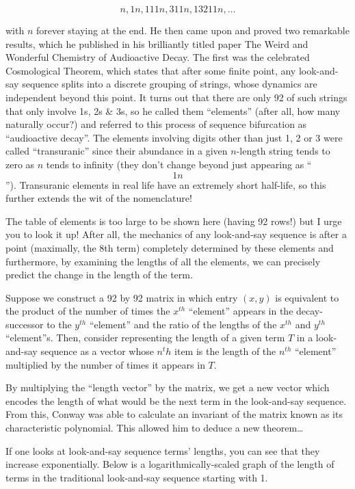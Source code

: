 \documentclass[titlepage,a4paper]{article}
\begin{document}
\[n, 1n, 111n, 311n, 13211n, \ldots\]

with \(n\) forever staying at the end. He then came upon and proved two remarkable results, which he published in his brilliantly titled paper The Weird and Wonderful Chemistry of Audioactive Decay. The first was the celebrated Cosmological Theorem, which states that after some finite point, any look-and-say sequence splits into a discrete grouping of strings, whose dynamics are independent beyond this point. It turns out that there are only 92 of such strings that only involve 1s, 2s \& 3s, so he called them “elements” (after all, how many naturally occur?) and referred to this process of sequence bifurcation as “audioactive decay”. The elements involving digits other than just 1, 2 or 3 were called “transuranic” since their abundance in a given \(n\)-length string tends to zero as \(n\) tends to infinity (they don’t change beyond just appearing as “$$1n$$”). Transuranic elements in real life have an extremely short half-life, so this further extends the wit of the nomenclature!\par
The table of elements is too large to be shown here (having 92 rows!) but I urge you to look it up! After all, the mechanics of any look-and-say sequence is after a point (maximally, the 8th term) completely determined by these elements and furthermore, by examining the lengths of all the elements, we can precisely predict the change in the length of the term.\par
Suppose we construct a 92 by 92 matrix in which entry \((x, y)\) is equivalent to the product of the number of times the \(x^{th}\) “element” appears in the decay-successor to the \(y^{th}\) “element” and the ratio of the lengths of the \(x^{th}\) and \(y^{th}\) “element”s. Then, consider representing the length of a given term \(T\) in a look-and-say sequence as a vector whose \(n^th\) item is the length of the \(n^{th}\) “element” multiplied by the number of times it appears in \(T\).\par
By multiplying the “length vector” by the matrix, we get a new vector which encodes the length of what would be the next term in the look-and-say sequence. From this, Conway was able to calculate an invariant of the matrix known as its characteristic polynomial. This allowed him to deduce a new theorem…\par
If one looks at look-and-say sequence terms’ lengths, you can see that they increase exponentially. Below is a logarithmically-scaled graph of the length of terms in the traditional look-and-say sequence starting with 1.\par
\end{document}
